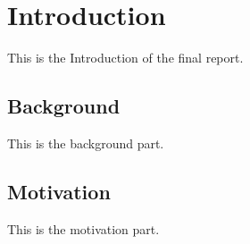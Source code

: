 \section{Introduction} 
This is the Introduction of the final report.\cite{Benner}
\subsection{Background}
This is the background part.
\subsection{Motivation}
This is the motivation part.

\newpage